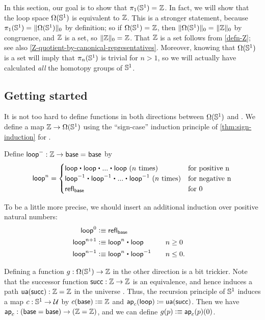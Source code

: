 In this section, our goal is to show that $\id {\pi_1(\Sn ^1)} {\Z}$.
In fact, we will show that the loop space ${\Omega(\Sn ^1)}$ is equivalent to $\Z$.
This is a stronger statement, because $\id{\pi_1(\Sn ^1)} {\trunc 0 {\Omega(\Sn ^1)}}$ by
definition; so if $\id {\Omega(\Sn ^1)} {\Z}$, then $\id {\trunc
  0 {\Omega(\Sn ^1)}} {\trunc 0 {\Z}}$ by congruence, and
$\Z$ is a set, so $\id {\trunc 0 {\Z}} {\Z}$.
That $\Z$ is a set follows from \autoref{defn-Z}; see also \autoref{Z-quotient-by-canonical-representatives}.
Moreover, knowing that ${\Omega(\Sn ^1)}$ is a set will imply that $\pi_n(\Sn^1)$ is trivial for $n>1$, so we will actually have calculated \emph{all} the homotopy groups of $\Sn^1$.

\subsection{Getting started}
\label{sec:pi1s1-initial-thoughts}

It is not too hard to define functions in both directions between $\Omega(\Sn^1)$ and \Z.
We define a map $\Z\to\Omega(\Sn^1)$ using the ``sign-case'' induction principle of \autoref{thm:sign-induction} for \Z.

\begin{defn}
Define $\lloop^- : \Z \rightarrow \id{\base}{\base}$ by 
\[
\lloop^n = \begin{cases} \lloop \ct \lloop \ct ... \ct \lloop \text{ ($n$ times) } & \text{for positive n} \\
 \opp \lloop \ct \opp \lloop \ct ... \ct \opp \lloop \text{ ($n$ times)} & \text{for negative n} \\
  \refl{\base} & \text{for 0}  
\end{cases}
\]
\end{defn}

To be a little more precise, we should insert an additional induction over positive natural numbers:
\begin{alignat*}{2}
  \lloop^0 &\defeq \refl{\base}\\
  \lloop^{n+1} &\defeq \lloop^n \ct \lloop
  &&\quad n\ge 0\\
  \lloop^{n-1} &\defeq \lloop^n \ct \opp\lloop
  &&\quad n\le 0.
\end{alignat*}

Defining a function $g:\Omega(\Sn^1)\to\Z$ in the other direction is a bit trickier.
Note that the successor function $\Zsuc:\Z\to\Z$ is an equivalence, and hence induces a path $\ua(\Zsuc):\Z=\Z$ in the universe \type.
Thus, the recursion principle of $\Sn^1$ induces a map $c:\Sn^1\to\type$ by $c(\base)\defeq \Z$ and $\apfunc c (\lloop) \defid \ua(\Zsuc)$.
Then we have $\apfunc{c} : (\base=\base) \to (\Z=\Z)$, and we can define $g(p)\defeq \apfunc{c}(p)(0)$.

